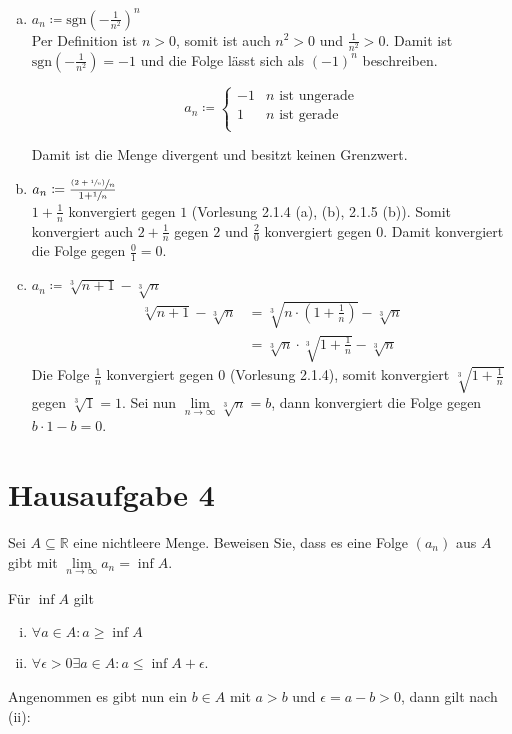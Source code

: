 \documentclass{article}
\begin{document}
\begin{enumerate}[a)]
\item $a_n \coloneqq \text{sgn}\left(-\frac{1}{n^2}\right)^n$ \\
  Per Definition ist $n > 0$, somit ist auch $n^2 > 0$ und $\frac{1}{n^2} > 0$.
  Damit ist $\text{sgn}\left(-\frac{1}{n^2}\right) = -1$ und die Folge lässt sich als $(-1)^n$ beschreiben.

  \[
    a_n \coloneqq \begin{cases}
      -1 & n \text{ ist ungerade} \\
      1  & n \text{ ist gerade} \\
    \end{cases}
  \]

  Damit ist die Menge divergent und besitzt keinen Grenzwert.
  
\item $a_n \coloneqq \frac{\sfrac{(2+\sfrac{1}{n})}{n}}{1+\sfrac{1}{n}}$ \\
  $1 + \frac{1}{n}$ konvergiert gegen $1$ (Vorlesung 2.1.4 (a), (b), 2.1.5 (b)).
  Somit konvergiert auch $2 + \frac{1}{n}$ gegen $2$ und $\frac{2}{0}$ konvergiert gegen $0$.
  Damit konvergiert die Folge gegen $\frac{0}{1} = 0$.
\item $a_n \coloneqq \sqrt[3]{n+1} - \sqrt[3]{n}$ \\
  \begin{align*}
    \sqrt[3]{n+1} - \sqrt[3]{n} &= \sqrt[3]{n \cdot \left(1 + \frac{1}{n}\right)} - \sqrt[3]{n} \\
                                &= \sqrt[3]{n} \cdot \sqrt[3]{1 + \frac{1}{n}} - \sqrt[3]{n}
  \end{align*}
  Die Folge $\frac{1}{n}$ konvergiert gegen $0$ (Vorlesung 2.1.4), somit konvergiert $\sqrt[3]{1 + \frac{1}{n}}$
  gegen $\sqrt[3]{1} = 1$. Sei nun $\underset{n\to\infty}\lim \sqrt[3]{n} = b$, dann konvergiert die Folge gegen
  $b \cdot 1 - b = 0$.
\end{enumerate}

\newpage
\section*{Hausaufgabe 4}

Sei $A \subseteq \mathbb{R}$ eine nichtleere Menge. Beweisen Sie, dass es eine Folge $(a_n)$ aus $A$ gibt mit
$\underset{n\to\infty}\lim a_n = \inf A$.

\noindent
Für $\inf A$ gilt

\begin{enumerate}[(i)]
\item $\forall a \in A \colon a \geq \inf A$
\item $\forall \epsilon > 0 \exists a \in A \colon a \leq \inf A + \epsilon$.
\end{enumerate}
Angenommen es gibt nun ein $b \in A$ mit $a > b$ und $\epsilon = a - b > 0$, dann gilt nach (ii):
\end{document}
